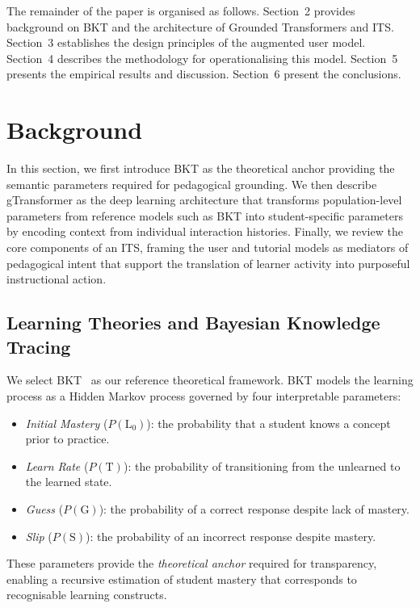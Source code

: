 \documentclass[runningheads]{llncs}
\begin{document}
The remainder of the paper is organised as follows. Section~2 provides background on BKT and the architecture of Grounded Transformers and ITS. Section~3 establishes the design principles of the augmented user model. Section~4 describes the methodology for operationalising this model. Section~5 presents the empirical results and discussion. Section~6 present the conclusions.

%

\section{Background}

In this section, we first introduce BKT as the theoretical anchor providing the semantic parameters required for pedagogical grounding. We then describe gTransformer as the deep learning architecture that transforms population-level parameters from reference models such as BKT into student-specific parameters by encoding context from individual interaction histories. Finally, we review the core components of an ITS, framing the user and tutorial models as mediators of pedagogical intent that support the translation of learner activity into purposeful instructional action.

\subsection{Learning Theories and Bayesian Knowledge Tracing}

We select BKT~\cite{corbett1994knowledge} as our reference theoretical framework. BKT models the learning process as a Hidden Markov process governed by four interpretable parameters:

\begin{itemize}
    \item \textit{Initial Mastery} ($P(\text{L}_0)$): the probability that a student knows a concept prior to practice.
    \item \textit{Learn Rate} ($P(\text{T})$): the probability of transitioning from the unlearned to the learned state.
    \item \textit{Guess} ($P(\text{G})$): the probability of a correct response despite lack of mastery.
    \item \textit{Slip} ($P(\text{S})$): the probability of an incorrect response despite mastery.
\end{itemize}

These parameters provide the \textit{theoretical anchor} required for transparency, enabling a recursive estimation of student mastery that corresponds to recognisable learning constructs.
\end{document}
